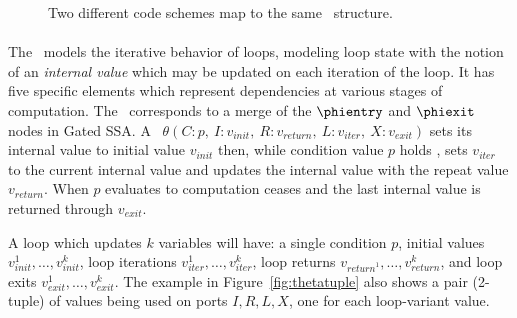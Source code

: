 {\begin{figure}[!hb]
\hfill
{}
\caption{Two different code schemes map to the same \Gn\ structure.}

\label{fig:twinPhis}
\end{figure}


\paragraph{\Tns}
The \Tn\ models the iterative behavior of loops, modeling loop state with the notion of an \emph{internal value} which may be updated on each iteration of the loop. 
It has five specific elements which represent dependencies at various stages of computation. 
The \Tn\ corresponds to a merge of the $\phientry$ and $\phiexit$ nodes in Gated SSA.
%
A \Tn\ $\theta(C:p,\ I:v_\textit{init},\ R:v_\textit{return},\ L: v_\textit{iter},\ X:v_{exit})$ sets its internal value to initial value $v_\textit{init}$ then, while condition value $p$ holds \true, sets $v_\textit{iter}$ to the current internal value and updates the internal value with the repeat value $v_\textit{return}$. 
When $p$ evaluates to \false computation ceases and the last internal value is returned through $v_\textit{exit}$.

%
A loop which updates $k$ variables will have: 
a single condition $p$, initial values $v_{\textit{init}}^1,\ldots,v_{\textit{init}}^k$, loop iterations $v_{\textit{iter}}^1,\ldots,v_{\textit{iter}}^k$, loop returns $v_{\textit{return}^1},\ldots,v_{\textit{return}}^k$, and loop exits $v_{\textit{exit}}^1,\ldots,v_{\textit{exit}}^k$.
The example in Figure~\ref{fig:thetatuple} also shows a pair (2-tuple) of values being used on ports $I,R,L,X$, one for each loop-variant value.

}
